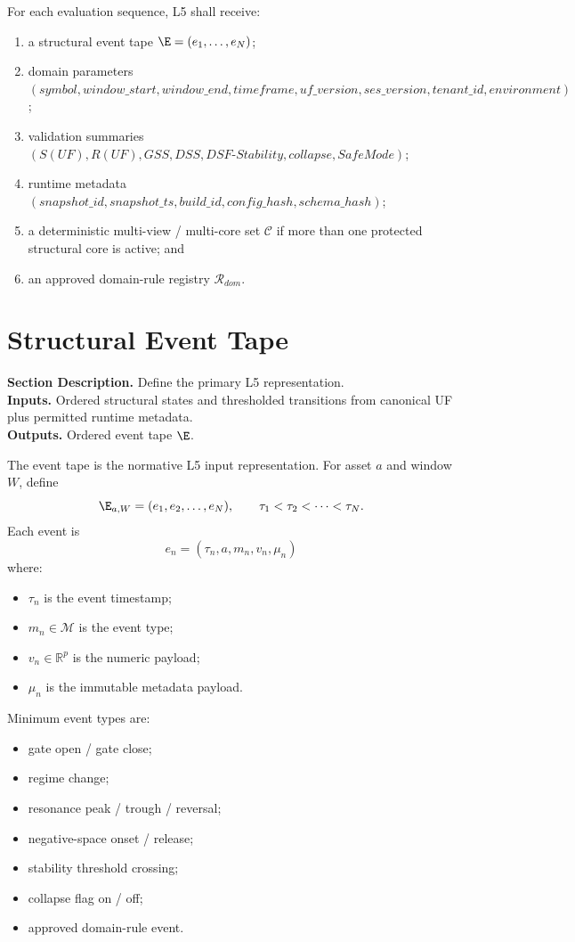 \documentclass[11pt]{report}
\newcommand{\R}{\mathbb{R}}
\newcommand{\meta}[3]{\textbf{Section Description.} #1\\
\textbf{Inputs.} #2\\
\textbf{Outputs.} #3\par}
\begin{document}
For each evaluation sequence, L5 shall receive:
\begin{enumerate}[leftmargin=1.2cm]
    \item a structural event tape $\E=(e_1,\dots,e_N)$;
    \item domain parameters $(symbol, window\_start, window\_end, timeframe, uf\_version, ses\_version, tenant\_id, environment)$;
    \item validation summaries $(S(UF),R(UF),GSS,DSS,DSF\text{-}Stability,collapse,SafeMode)$;
    \item runtime metadata $(snapshot\_id, snapshot\_ts, build\_id, config\_hash, schema\_hash)$;
    \item a deterministic multi-view / multi-core set $\mathcal{C}$ if more than one protected structural core is active; and
    \item an approved domain-rule registry $\mathcal{R}_{dom}$.
\end{enumerate}

\section{Structural Event Tape}
\meta{Define the primary L5 representation.}{Ordered structural states and thresholded transitions from canonical UF plus permitted runtime metadata.}{Ordered event tape $\E$.}

The event tape is the normative L5 input representation. For asset $a$ and window $W$, define
\[
\E_{a,W}=(e_1,e_2,\dots,e_N),\qquad \tau_1<\tau_2<\cdots<\tau_N.
\]
Each event is
\[
e_n=(\tau_n,a,m_n,v_n,\mu_n)
\]
where:
\begin{itemize}
    \item $\tau_n$ is the event timestamp;
    \item $m_n\in\mathcal{M}$ is the event type;
    \item $v_n\in\R^{p}$ is the numeric payload;
    \item $\mu_n$ is the immutable metadata payload.
\end{itemize}

Minimum event types are:
\begin{itemize}
    \item gate open / gate close;
    \item regime change;
    \item resonance peak / trough / reversal;
    \item negative-space onset / release;
    \item stability threshold crossing;
    \item collapse flag on / off;
    \item approved domain-rule event.
\end{itemize}
\end{document}
